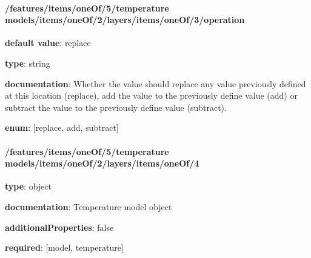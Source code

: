 \begin{itemized}
\end{itemized}\paragraph{/features/items/oneOf/5/temperature models/items/oneOf/2/layers/items/oneOf/3/operation} \begin{itemized}
\item {\bf default value}: replace
\item {\bf type}: string
\item {\bf documentation}: Whether the value should replace any value previously defined at this location (replace), add the value to the previously define value (add) or subtract the value to the previously define value (subtract).
\item {\bf enum}: [replace, add, subtract]\end{itemized}\paragraph{/features/items/oneOf/5/temperature models/items/oneOf/2/layers/items/oneOf/4} \begin{itemized}
\item {\bf type}: object
\item {\bf documentation}: Temperature model object
\item {\bf additionalProperties}: false
\item {\bf required}: [model, temperature]\end{itemized}
